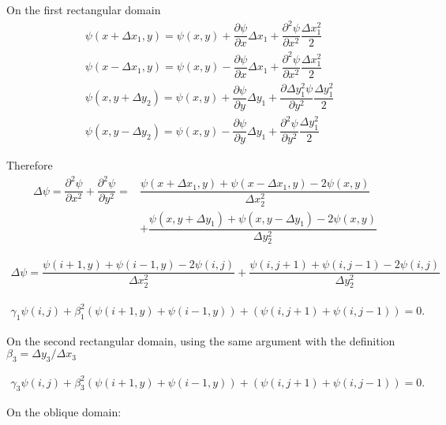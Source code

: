\documentclass[12pt, a4paper]{book}
\begin{document}
%     

On the first rectangular domain
\begin{align*}
    & \psi(x + \Delta x_1, y) = \psi(x,y) + \dfrac{\partial \psi}{\partial x}\Delta x_1 + \dfrac{\partial^2 \psi}{\partial x^2} \dfrac{\Delta x_1^2}{2} \\
    & \psi(x - \Delta x_1, y) = \psi(x,y) - \dfrac{\partial \psi}{\partial x}\Delta x_1 + \dfrac{\partial^2 \psi}{\partial x^2} \dfrac{\Delta x_1^2}{2} \\
    & \psi(x, y + \Delta y_2) = \psi(x,y) + \dfrac{\partial \psi}{\partial y}\Delta y_1 + \dfrac{\partial\Delta y_1^2 \psi}{\partial y^2} \dfrac{\Delta y_1^2}{2} \\
    & \psi(x, y - \Delta y_2) = \psi(x,y) - \dfrac{\partial \psi}{\partial y}\Delta y_1 + \dfrac{\partial^2 \psi}{\partial y^2} \dfrac{\Delta y_1^2}{2}
\end{align*}

Therefore
\begin{align*}
    \Delta \psi = \dfrac{\partial^2 \psi}{\partial x^2} + \dfrac{\partial^2 \psi}{\partial y^2} = & \dfrac{\psi(x + \Delta x_1, y) + \psi(x - \Delta x_1, y) - 2\psi(x, y)}{\Delta x_2^2} \\
    & + \dfrac{\psi(x, y + \Delta y_1) + \psi(x, y - \Delta y_1) - 2\psi(x, y)}{\Delta y_2^2}
\end{align*}

\begin{align*}
    \Delta \psi = \dfrac{\psi(i + 1, y) + \psi(i - 1, y) - 2\psi(i, j)}{\Delta x_2^2} + \dfrac{\psi(i, j + 1) + \psi(i, j - 1) - 2\psi(i, j)}{\Delta y_2^2}
\end{align*}

\begin{align}
    \gamma_1 \psi(i, j) + \beta_1^2 \left( \psi(i + 1, y) + \psi(i - 1, y) \right) + \left( \psi(i, j + 1) + \psi(i, j - 1) \right) = 0.
\end{align}

On the second rectangular domain, using the same argument with the definition $\beta_3 = \Delta y_3 / \Delta x_3$

\begin{align}
    \gamma_3 \psi(i, j) + \beta_3^2 \left( \psi(i + 1, y) + \psi(i - 1, y) \right) + \left( \psi(i, j + 1) + \psi(i, j - 1) \right) = 0.
\end{align}

On the oblique domain:
\end{document}
